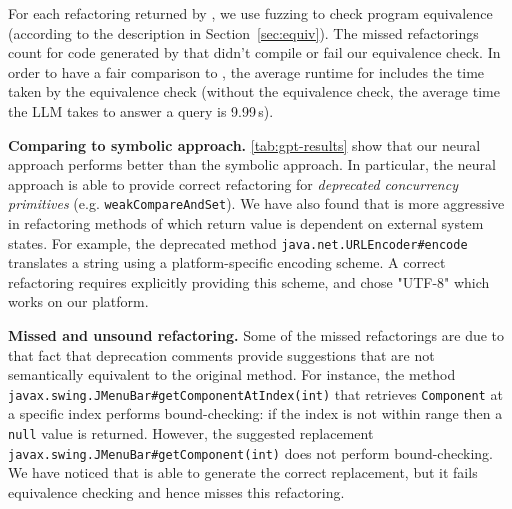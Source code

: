\documentclass[sigconf,review,anonymous]{acmart}
\begin{document}
For each refactoring returned by \llm, we use fuzzing to check program equivalence (according to the
description in Section~\ref{sec:equiv}). The missed refactorings count for code generated by \llm that didn't compile or fail our equivalence check.
In order to have a fair comparison to \tool, the average runtime for \llm includes the time taken by the equivalence check
(without the equivalence check, the average time the LLM takes to answer a query is 9.99\,s).


{\bf Comparing to symbolic approach.}
\autoref{tab:gpt-results} show that our neural approach performs better than the symbolic approach.
In particular, the neural approach is able to provide correct refactoring for \emph{deprecated concurrency primitives}
(e.g. \lstinline{weakCompareAndSet}). We have also found that \llm is more aggressive in refactoring methods
of which return value is dependent on external system states. For example, the deprecated method \lstinline{java.net.URLEncoder#encode}
translates a string using a platform-specific encoding scheme. A correct refactoring requires explicitly providing
this scheme, and \llm chose "UTF-8" which works on our platform.

{\bf Missed and unsound refactoring.}
Some of the missed refactorings are due to that fact that deprecation comments provide suggestions
that are not semantically equivalent to the original method. For instance, the method \lstinline{javax.swing.JMenuBar#getComponentAtIndex(int)}
that retrieves \lstinline{Component} at a specific index performs bound-checking: if the index is not within
range then a \lstinline{null} value is returned. However, the suggested replacement \lstinline{javax.swing.JMenuBar#getComponent(int)}
does not perform bound-checking. We have noticed that \llm is able to generate the correct replacement, but
it fails equivalence checking and hence misses this refactoring.
\end{document}
